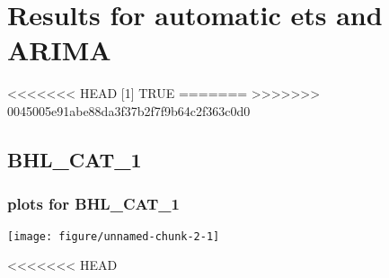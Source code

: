\documentclass[10pt,a4paper]{article}\usepackage[]{graphicx}\usepackage[]{color}
\makeatletter
\def\maxwidth{ %
  \ifdim\Gin@nat@width>\linewidth
    \linewidth
  \else
    \Gin@nat@width
  \fi
}
\newcommand{\AaA}{\_}
\makeatother
\begin{document}
\newpage

\section{Results for automatic ets and ARIMA}

<<<<<<< HEAD
[1] TRUE
=======
>>>>>>> 0045005e91abe88da3f37b2f7f9b64c2f363c0d0
\subsection{BHL\AaA CAT\AaA 1}
\subsubsection{plots for BHL\AaA CAT\AaA 1}

\texttt{[image: figure/unnamed-chunk-2-1]} 

\newpage
<<<<<<< HEAD
\end{document}
